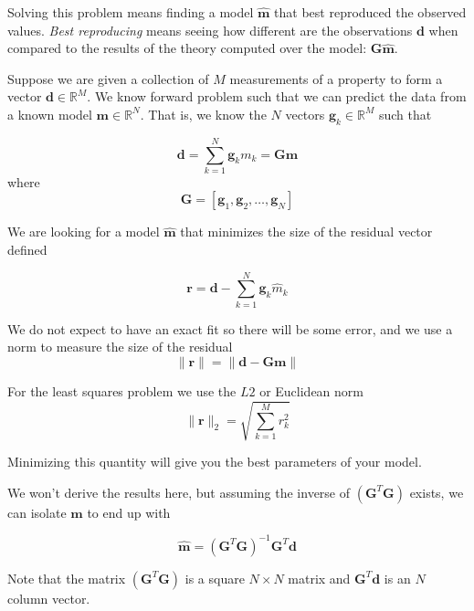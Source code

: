 \documentclass{article}
\newcommand{\real}{\mathbb{R}}
\begin{document}
Solving this problem means finding a model $\mathbf{\hat{m}}$ that best reproduced the observed values. \emph{Best reproducing} means seeing how different are the observations $\mathbf{d}$ when compared to the results of the theory computed over the model: $\mathbf{G} \mathbf{\hat{m}}$.

Suppose we are given a collection of $M$ measurements of a property to
form a vector $\mathbf{d} \in \real^M$. We know forward problem such
that we can predict the data from a known model $\mathbf{m} \in
\real^N$. That is, we know the $N$ vectors $\mathbf{g}_k \in \real^M$
such that   

\begin{equation}
\mathbf{d} = \sum_{k=1}^{N} \mathbf{g}_k m_k = \mathbf{G} \mathbf{m}
\end{equation}
where
\begin{equation}
\mathbf{G} = \left[ \mathbf{g}_1, \mathbf{g}_2, \dots, \mathbf{g}_N \right] 
\end{equation}

We are looking for a model $\hat{\mathbf{m}}$ that minimizes the size of the residual vector defined

\begin{equation}
\mathbf{r} = \mathbf{d} -  \sum_{k=1}^{N} \mathbf{g}_k \hat{m}_k
\end{equation}

We do not expect to have an exact fit so there will be some error, and we use a norm to measure the size of the residual
\begin{equation}
\| \mathbf{r} \| = \| \mathbf{d} - \mathbf{Gm} \|
\end{equation}

For the least squares problem we use the $L2$ or Euclidean norm 
\begin{equation}
\| \mathbf{r} \|_2 = \sqrt{\sum_{k=1}^M r^2_k}
\end{equation}

Minimizing this quantity will give you the best parameters of your model.


We won't derive the results here, but assuming the inverse of $(\mathbf{G}^T \mathbf{G})$ exists, we can isolate $\hat{\mathbf{m}}$ to end up with

\begin{equation}
\hat{\mathbf{m}} = {(\mathbf{G}^T \mathbf{G})}^{-1}\mathbf{G}^T \mathbf{d}   
\end{equation}

Note that the matrix ${(\mathbf{G}^T \mathbf{G})}$ is a square $N\times N$ matrix and $\mathbf{G}^T\mathbf{d}$ is an $N$ column vector. 
\end{document}
